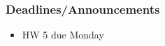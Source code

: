 
\begin{frame}
    \frametitle{Deadlines/Announcements}
    \begin{itemize}
        \item HW 5 due Monday
    \end{itemize}
\end{frame}
